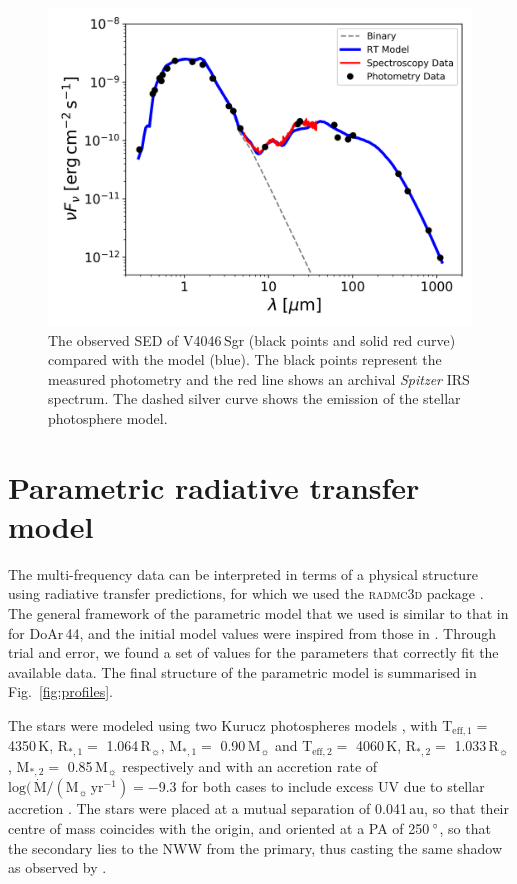 \documentclass[usenatbib,times]{mnras}
\begin{document}
\begin{figure}
	\centering
	\includegraphics[width=\columnwidth]{SED_.png}
    \caption{The observed SED of V4046\,Sgr (black points and solid red curve) compared with the model (blue). The black points represent the measured photometry and the red line shows an archival \textit{Spitzer} IRS spectrum. The dashed silver curve shows the emission of the stellar photosphere model.}
    \label{fig:SED}
\end{figure}

\section{Parametric radiative transfer model} \label{sec:model}

The multi-frequency data can be interpreted in terms of a physical structure using radiative transfer predictions, for which we used the \textsc{radmc3d} package \citep{Dullemond_2012}. The general framework of the parametric model that we used is similar to that in \citet{2018MNRAS.477.5104C} for DoAr\,44, and the initial model values were inspired from those in \citet{Rosenfeld_2013}. Through trial and error, we found a set of values for the parameters that correctly fit the available data. The final structure of the parametric model is summarised in  Fig.~\ref{fig:profiles}.

The stars were modeled using two Kurucz photospheres models \citep{1979ApJS...40....1K, 1997A&A...318..841C}, with T$_{\mathrm{eff},1} =$ 4350\,K, R$_{*,1} =$ 1.064\,R$_{\sun}$, M$_{*,1} =$ 0.90\,M$_{\sun}$ and T$_{\mathrm{eff},2} =$ 4060\,K, R$_{*,2} =$ 1.033\,R$_{\sun}$, M$_{*,2} =$ 0.85\,M$_{\sun}$ respectively and with an accretion rate of $\mathrm{log}(\,\dot{\mathrm{M}}/(\mathrm{M}_{\sun}\,\mathrm{yr^{-1}}) = -$9.3 for both cases to include excess UV due to stellar accretion \citep{10.1111/j.1365-2966.2011.19366.x}. The stars were placed at a mutual separation of 0.041\,au, so that their centre of mass coincides with the origin, and oriented at a PA of 250\,$\hbox{$^\circ$}$, so that the secondary lies to the NWW from the primary, thus casting the same shadow as observed by \citet{dOrazi}.
\end{document}
